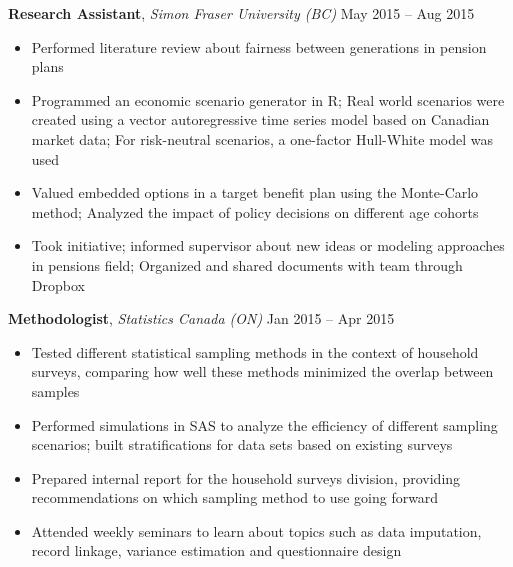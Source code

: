 \documentclass[11pt]{article}
\begin{document}
\vspace{2mm}
\begin{addmargin}[2.75em]{0em}
\textbf{Research Assistant}, \textit{Simon Fraser University (BC)} \hfill May 2015 -- Aug 2015
\end{addmargin}
%
\vspace{1mm}
\begin{addmargin}[1.75em]{0em}
\begin{itemize}
\setlength\itemsep{-0.4em}
\item Performed literature review about fairness between generations in pension plans
\item Programmed an economic scenario generator in R; Real world scenarios were created using a vector autoregressive time series model based on Canadian market data; For risk-neutral scenarios, a one-factor Hull-White model was used
\item Valued embedded options in a target benefit plan using the Monte-Carlo method; Analyzed the impact of policy decisions on different age cohorts
\item Took initiative; informed supervisor about new ideas or modeling approaches in pensions field; Organized and shared documents with team through Dropbox
\end{itemize}
\end{addmargin}
%
\vspace{2mm}
\begin{addmargin}[2.75em]{0em}
\textbf{Methodologist}, \textit{Statistics Canada (ON)} \hfill Jan 2015 -- Apr 2015
\end{addmargin}
%
\vspace{1mm}
\begin{addmargin}[1.75em]{0em}
\begin{itemize}
\setlength\itemsep{-0.4em}
\item Tested different statistical sampling methods in the context of household surveys, comparing how well these methods minimized the overlap between samples
\item Performed simulations in SAS to analyze the efficiency of different sampling scenarios; built stratifications for data sets based on existing surveys
\item Prepared internal report for the household surveys division, providing recommendations on which sampling method to use going forward
\item Attended weekly seminars to learn about topics such as data imputation, record linkage, variance estimation and questionnaire design
\end{itemize}
\end{addmargin}
\end{document}
